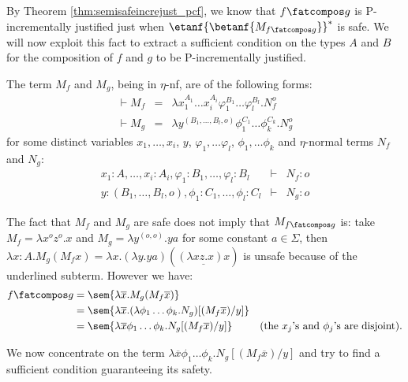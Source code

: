 By Theorem \ref{thm:semisafeincrejust_pcf}, we know that $f\fatcompos g$ is P-incrementally justified just when $\etanf{\betanf{M_{f\fatcompos g}}}^*$ is safe.
We will now exploit this fact to extract a sufficient condition on the types $A$ and $B$ for
the composition of $f$ and $g$ to be P-incrementally justified.

The term $M_f$ and $M_g$, being in $\eta$-nf, are of the following forms:
\begin{eqnarray*}
\vdash M_f &=& \lambda x_1^{A_1} \ldots x_i^{A_i} \varphi_1^{B_1} \ldots \varphi_l^{B_l} . N_f^o\\
\vdash  M_g &=& \lambda y^{ (B_1, \ldots, B_l,o)} \phi_1^{C_1} \ldots \phi_k^{C_k} . N_g^o
\end{eqnarray*}
for some distinct variables $x_1, \ldots, x_i$, $y$, $\varphi_1, \dots \varphi_l$, $\phi_1, \dots \phi_k$  and $\eta$-normal terms $N_f$ and $N_g$:
\begin{eqnarray*}
x_1:A, \ldots, x_i:A_i, \varphi_1:B_1, \dots, \varphi_l:B_l &\vdash& N_f :o \\
y: (B_1, \ldots, B_l,o), \phi_1:C_1, \dots, \phi_l:C_l &\vdash& N_g :o
\end{eqnarray*}



The fact that $M_f$ and $M_g$ are safe does not imply that $M_{f\fatcompos g}$ is: take $M_f = \lambda x^o z^o.x$ and $M_g = \lambda y^{(o,o)} . y a$ for some constant $a\in \Sigma$, then $\lambda x:A . M_g (M_f x) = \lambda x . (\lambda y . y a) ( \underline{(\lambda x z.x) x} )$ is unsafe because of the underlined subterm. However we have:
\begin{align*}
f\fatcompos g &= \sem{\lambda \overline{x} . M_g (M_f  \overline{x})} \\
 &= \sem{\lambda \overline{x} . (\lambda \phi_1\ldots \phi_k . N_g) [(M_f \overline{x}) / y]} \\
&= \sem{\lambda \overline{x} \phi_1 \dots \phi_k. N_g [(M_f  \overline{x}) / y]}
& \mbox{(the $x_j$'s and $\phi_j$'s are disjoint)}.
\end{align*}

We now concentrate on the term  $\lambda \overline{x} \phi_1 \dots \phi_k. N_g [(M_f  \overline{x}) / y]$ and try to find a sufficient condition guaranteeing its safety.
